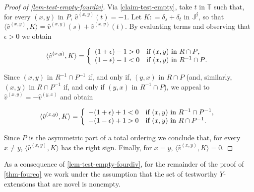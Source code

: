 \documentclass[12pt,a4paper,twoside]{article}
\newcommand{\novel}{\mathfrak f}
\newcommand{\mbbt}{{\mathds {T}}}
\newcommand{\mbbjp}{{\mathds {J}^{\novel}}}
\newcommand{\xy}{{(x, y)}}
\newcommand{\yx}{{(y, x)}}
\begin{document}
\begin{appendices}
\begin{proof}[Proof of \cref{lem-test-empty-fourdiv}]
  Via \cref{claim-test-empty}, take $ t$ in $ \mbbt $ such that, for every
  $ \xy $ in $ P$, $ \hat{v}^{ \xy } ( t ) = -1 $.  Let
  $ K : = \delta _{ s } + \delta _{ t } $ in $ \mbbjp $, so that
  $\langle \hat{v}^{\xy}, K \rangle = \hat{v}^{\xy}(s) + \hat{v}^{\xy}(t)$. By evaluating
  terms and observing that $\epsilon > 0 $ we obtain
\begin{linenomath*}  
 \begin{equation*}
   \langle  \hat{v}^{\xy}, K \rangle =
   \left \{
      \begin{array}{l l}
        (1+ \epsilon) - 1 > 0  & \text{if $ \xy $ in $ {R} \cap P   $},\\
                 (1- \epsilon) - 1 < 0 & \text{if $\xy $ in ${R}^{-1}\cap P $}.
      \end{array}
    \right.
  \end{equation*}
\end{linenomath*}  
  Since $\xy $ in ${R}^{-1} \cap P^{-1} $ if, and only if,
  $\yx $ in ${R}\cap P$ (and, similarly,
  $\xy $ in ${R} \cap P^{-1}$ if, and only if $ \yx$ in
  ${R}^{-1}\cap P$), we appeal to $\hat{v}^{\xy} = - \hat{v}^{\yx}$ and obtain
\begin{linenomath*}
 \begin{equation*}
   \langle  \hat{v}^{\xy}, K \rangle =
   \left \{
      \begin{array}{l l}
        -( 1 + \epsilon) + 1 < 0 & \text{if $ \xy $ in $ {R}^{-1} \cap P^{-1}$,}\\
        -(1- \epsilon) + 1 > 0  & \text{if $ \xy $ in $ {R} \cap P^{-1}  $.}
      \end{array}
    \right.
  \end{equation*}
\end{linenomath*}
Since
$P$ is the asymmetric part of a total ordering we conclude that, for every
$x\neq y$, $\langle \hat{v}^{\xy}, K \rangle
$ has the right sign. Finally, for $x = y $, $\langle \hat{v}^{\xy}, K \rangle =
0$.
\end{proof}

As a consequence of \cref{lem-test-empty-fourdiv}, for the remainder of the proof of
\cref{thm-foureq} we work under the assumption that the set of testworthy
$ Y $-extensions that are novel is nonempty. 


\end{appendices}
\end{document}

